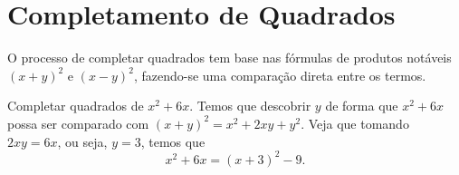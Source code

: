  
 
 
 
 

 


 
\section{Completamento de Quadrados}

O processo de completar quadrados tem base nas fórmulas de produtos notáveis $(x+y)^2$ e $(x-y)^2$, fazendo-se uma comparação direta entre os termos.
\begin{exem}
  Completar quadrados de $x^2+6x$. Temos que descobrir $y$ de forma que $x^2+6x$ possa ser comparado com $(x+y)^2=x^2+2xy+y^2$. Veja que tomando $2xy=6x$, ou seja, $y=3$, temos que
  \begin{equation*}
      x^2+6x = (x+3)^2-9.
  \end{equation*}
\end{exem}

